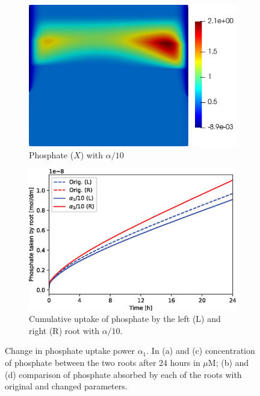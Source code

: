 \documentclass[11pt]{article}
\numberwithin{equation}{section}
\begin{document}
\begin{figure}[!htb]
\begin{subfigure}[t]{0.35\textwidth}
    \includegraphics[width=\textwidth]{Figures/X_alpha1divby10.png}
    \caption{Phosphate ($X$) with $\alpha / 10$}
    \label{fig:numexp_a1_down1}
\end{subfigure}
\hspace{1cm}
\begin{subfigure}[t]{0.4\textwidth}
    \includegraphics[width=\textwidth]{Figures/alpha1divby10.eps}
    \caption{Cumulative uptake of phosphate by the left (L) and right (R) root with $\alpha / 10$.}
    \label{fig:numexp_a1_down2}
\end{subfigure}

\caption{Change in phosphate uptake power $\alpha_1$. In (a) and (c) concentration of phosphate between the two roots after 24 hours in $\mu$M; (b) and (d) comparison of phosphate absorbed by each of the roots with original and changed parameters.}
\end{figure}
\end{document}
